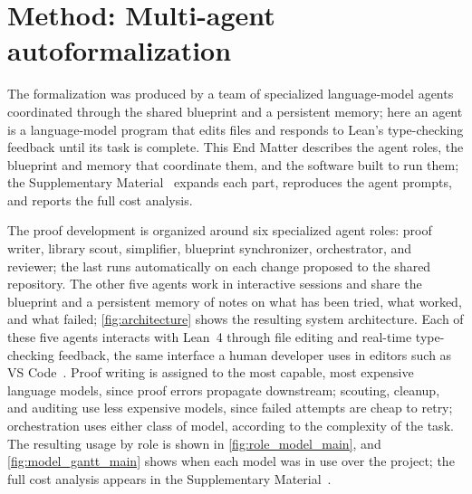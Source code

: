 

\section*{Method: Multi-agent autoformalization}


The formalization was produced by a team of specialized language-model agents coordinated through the shared blueprint and a persistent memory; here an agent is a language-model program that edits files and responds to Lean's type-checking feedback until its task is complete. This End Matter describes the agent roles, the blueprint and memory that coordinate them, and the software built to run them; the Supplementary Material~\cite{Supp} expands each part, reproduces the agent prompts, and reports the full cost analysis.

The proof development is organized around six specialized agent roles: proof writer, library scout, simplifier, blueprint synchronizer, orchestrator, and reviewer; the last runs automatically on each change proposed to the shared repository. The other five agents work in interactive sessions and share the blueprint and a persistent memory of notes on what has been tried, what worked, and what failed; \cref{fig:architecture} shows the resulting system architecture. Each of these five agents interacts with Lean~4 through file editing and real-time type-checking feedback, the same interface a human developer uses in editors such as VS Code~\cite{MicrosoftCorporation2024Visual}. Proof writing is assigned to the most capable, most expensive language models, since proof errors propagate downstream; scouting, cleanup, and auditing use less expensive models, since failed attempts are cheap to retry; orchestration uses either class of model, according to the complexity of the task. The resulting usage by role is shown in \cref{fig:role_model_main}, and \cref{fig:model_gantt_main} shows when each model was in use over the project; the full cost analysis appears in the Supplementary Material~\cite{Supp}.

